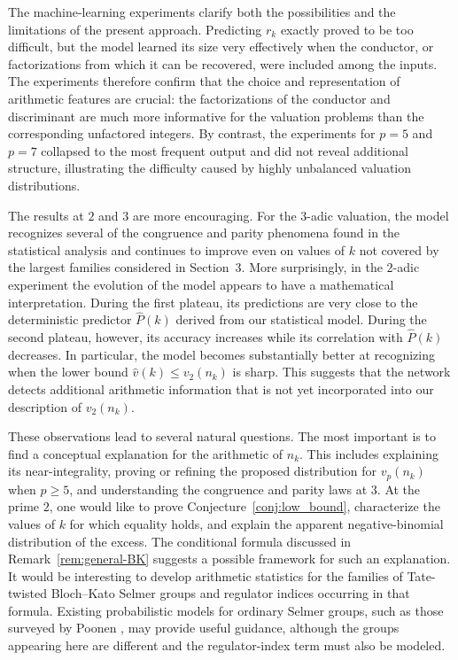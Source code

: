 \documentclass[12pt]{amsart}%
\newcommand{\1}{\mathds{1}}
\theoremstyle{definition}
\numberwithin{equation}{section}
\numberwithin{table}{section}
\numberwithin{figure}{section}
\begin{document}
The machine-learning experiments clarify both the possibilities and the
limitations of the present approach. Predicting $r_k$ exactly proved to be too
difficult, but the model learned its size very effectively when the conductor, or factorizations from which it can be recovered, were included among the inputs. The experiments
therefore confirm that the choice and representation of arithmetic features
are crucial: the factorizations of the conductor and discriminant are much
more informative for the valuation problems than the corresponding unfactored
integers. By contrast, the experiments for $p=5$ and $p=7$ collapsed to the
most frequent output and did not reveal additional structure, illustrating
the difficulty caused by highly unbalanced valuation distributions.

The results at $2$ and $3$ are more encouraging. For the $3$-adic valuation,
the model recognizes several of the congruence and parity phenomena found in
the statistical analysis and continues to improve even on values of $k$ not
covered by the largest families considered in Section~3. More surprisingly,
in the $2$-adic experiment the evolution of the model appears to have a
mathematical interpretation. During the first plateau, its predictions are
very close to the deterministic predictor $\widehat P(k)$ derived from our
statistical model. During the second plateau, however, its accuracy increases
while its correlation with $\widehat P(k)$ decreases. In particular, the
model becomes substantially better at recognizing when the lower bound
$\widehat v(k)\leq v_2(n_k)$ is sharp. This suggests that the network detects
additional arithmetic information that is not yet incorporated into our
description of $v_2(n_k)$.

These observations lead to several natural questions.
 The most important
is to find a conceptual explanation for the arithmetic of $n_k$. This includes
explaining its near-integrality, proving or refining the proposed distribution
for $v_p(n_k)$ when $p\geq5$, and understanding the congruence and parity laws
at $3$. At the prime $2$, one would like to prove
Conjecture~\ref{conj:low_bound}, characterize the values of $k$ for which
equality holds, and explain the apparent negative-binomial distribution of
the excess. The conditional formula discussed in
Remark~\ref{rem:general-BK} suggests a possible framework for such
an explanation.  It would be interesting to develop arithmetic
statistics for the families of Tate-twisted Bloch--Kato Selmer
groups and regulator indices occurring in that formula.  Existing
probabilistic models for ordinary Selmer groups, such as those
surveyed by Poonen \cite{Poonen}, may provide useful guidance, although the groups
appearing here are different and the regulator-index term must also
be modeled.
\end{document}
